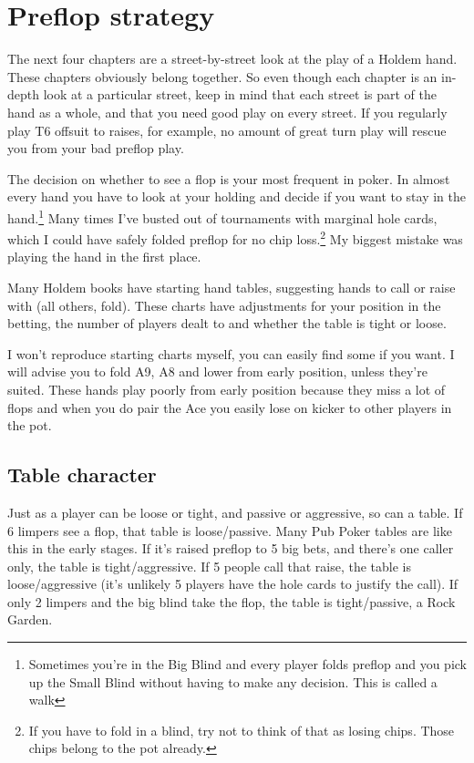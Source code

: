 \chapter{Preflop strategy}


The next four chapters are a street-by-street look at the play of a
Holdem hand. These chapters obviously belong together. So even though
each chapter is an in-depth look at a particular street, keep in mind
that each street is part of the hand as a whole, and that you need
good play on every street. If you regularly play T6 offsuit to raises,
for example, no amount of great turn play will rescue you from your
bad preflop play.

The decision on whether to see a flop is your most
frequent in poker. In almost every hand you have to look at your
holding and decide if you want to stay in the hand.\footnote{Sometimes
you're in the Big Blind and every player folds preflop and you pick
up the Small Blind without having to make any decision. This is called
a walk} Many times I've
busted out of tournaments with marginal hole
cards, which I could have safely folded preflop
for no chip loss.\footnote{If you have to fold in a blind, try not to
think of that as losing chips. Those chips belong to the pot already.}
My biggest mistake was playing the hand in the first place.

Many Holdem books have starting hand tables, suggesting
hands to call or raise with (all others, fold). These
charts have adjustments for your position in the betting,
the number of players dealt to and whether the table is tight or loose.

I won't reproduce starting charts myself, you can easily find some
if you want. I will advise you to fold A9, A8 and lower from early
position, unless they're suited. These hands play poorly from
early position because they miss a lot of flops and when you do
pair the Ace you easily lose on kicker to other players in the pot.

\section{Table character}

Just as a player can be loose or tight, and passive or
aggressive, so can a table. If 6 limpers see a flop,
that table is loose/passive. Many Pub Poker tables are like this
in the early stages. If it's raised preflop to
5 big bets, and there's one caller only, the table is
tight/aggressive. If 5 people call that raise, the table
is loose/aggressive (it's unlikely 5 players have the hole
cards to justify the call). If only 2 limpers and the big blind
take the flop, the table is tight/passive, a Rock Garden.

